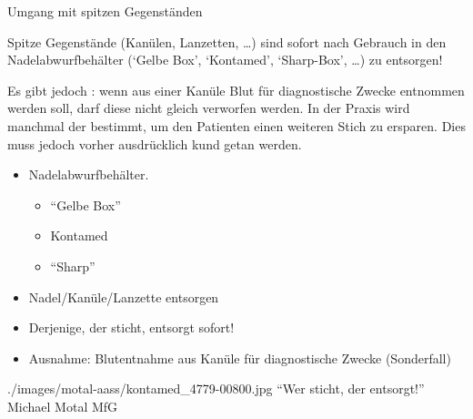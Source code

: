 \TextSlidePicture
{Umgang mit spitzen Gegenständen}%
{%
%
%
\label{topic:nadelabwurfbehaelter}%
\noindent Spitze Gegenstände (Kanülen, Lanz\-et\-ten, \ldots )
sind sofort nach Gebrauch in den Nadelabwurfbehälter (\enquote*{Gelbe Box},
\enquote*{Konta\-med\texttrademark}, \enquote*{Sharp-Box}, \ldots )
zu ent\-sorgen!

Es gibt jedoch : wenn aus einer Kanüle Blut
für diagnostische Zwecke entnommen werden soll, darf diese
nicht gleich verworfen werden. In der Praxis wird manchmal
der  bestimmt, um den
Patienten einen weiteren Stich zu ersparen. Dies muss jedoch
vorher ausdrücklich kund getan werden.}%
{
\begin{itemize}
  \item Nadelabwurfbehälter.
  \begin{itemize}
    \item \enquote{Gelbe Box}
    \item Kontamed{\texttrademark}
    \item \enquote{Sharp}
  \end{itemize} 
  \item Nadel/Kanüle/Lanzette  entsorgen
  \item Derjenige, der sticht, entsorgt sofort!
  \item Ausnahme: Blutentnahme aus Kanüle für diagnostische
  Zwecke (Sonderfall)
\end{itemize}}%
{./images/motal-aass/kontamed_4779-00800.jpg}%
{\enquote{Wer sticht, der entsorgt!}}%
{}%
{Michael Motal}%
{MfG}%



\begin{Synopsis}
\end{Synopsis}



